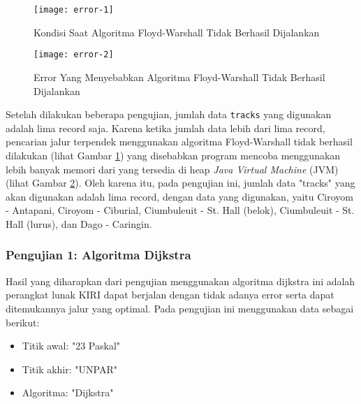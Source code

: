 \begin{figure}[H]
    \centering
    \texttt{[image: error-1]}
    \caption{Kondisi Saat Algoritma Floyd-Warshall Tidak Berhasil Dijalankan}
    \label{fig:error1}
\end{figure}

\begin{figure}[H]
    \centering
    \texttt{[image: error-2]}
    \caption{Error Yang Menyebabkan Algoritma Floyd-Warshall Tidak Berhasil Dijalankan}
    \label{fig:error2}
\end{figure}

Setelah dilakukan beberapa pengujian, jumlah data \texttt{tracks} yang digunakan adalah lima record saja. Karena ketika jumlah data lebih dari lima record, pencarian jalur terpendek menggunakan algoritma Floyd-Warshall tidak berhasil dilakukan (lihat Gambar \ref{fig:error1}) yang disebabkan program mencoba menggunakan lebih banyak memori dari yang tersedia di heap \textit{Java Virtual Machine} (JVM) (lihat Gambar \ref{fig:error2}). Oleh karena itu, pada pengujian ini, jumlah data "tracks" yang akan digunakan adalah lima record, dengan data yang digunakan, yaitu Ciroyom - Antapani, Ciroyom - Ciburial, Ciumbuleuit - St. Hall (belok), Ciumbuleuit - St. Hall (lurus), dan Dago - Caringin.

\begin{comment}
\begin{table}[H]
\centering
\caption{Data Pengujian}
\label{tab:data}
{\large
\begin{tabular}{|l|l|}
\hline
\textbf{trackId}       & \textbf{trackName}             \\ \hline
ciroyomantapani & Ciroyom - Antapani \\ \hline
ciroyomciburial & Ciroyom - Ciburial \\ \hline
ciumbuleuitsthallbelok   & Ciumbuleuit - St. Hall (belok)     \\ \hline
ciumbuleuitsthalllurus        & Ciumbuleuit - St. Hall (lurus)             \\ \hline
dagocaringin        & Dago - Caringin             \\ \hline
\end{tabular}
}
\end{table}
\end{comment}

\subsubsection{Pengujian 1: Algoritma Dijkstra}
Hasil yang diharapkan dari pengujian menggunakan algoritma dijkstra ini adalah perangkat lunak KIRI dapat berjalan dengan tidak adanya error serta dapat ditemukannya jalur yang optimal. Pada pengujian ini menggunakan data sebagai berikut:
\begin{itemize}
    \item Titik awal: "23 Paskal"
    \item Titik akhir: "UNPAR"
    \item Algoritma: "Dijkstra"
\end{itemize}

